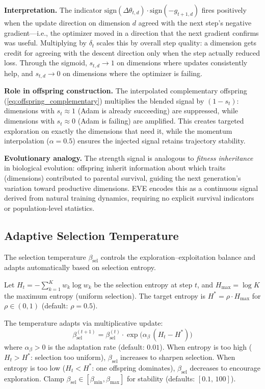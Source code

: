 \documentclass[12pt]{article}
\newcommand{\eqbox}[2]{%
  \begin{tcolorbox}[eqstyle, title={#1}]
    #2
  \end{tcolorbox}
}
\newcommand{\notebox}[1]{%
  \begin{tcolorbox}[notestyle]
    #1
  \end{tcolorbox}
}
\newcommand{\sign}{\mathrm{sign}}
\begin{document}
\textbf{Interpretation.}
The indicator
$\sign(\Delta\theta_{t,d}) \cdot \sign(-g_{t+1,d})$ fires positively
when the update direction on dimension $d$ agreed with the next step's
negative gradient---i.e., the optimizer moved in a direction that the
next gradient confirms was useful.
Multiplying by $\delta_t$ scales this by overall step quality: a
dimension gets credit for agreeing with the descent direction only
when the step actually reduced loss.
Through the sigmoid, $s_{t,d} \to 1$ on dimensions where updates
consistently help, and $s_{t,d} \to 0$ on dimensions where the
optimizer is failing.

\textbf{Role in offspring construction.}
The interpolated complementary offspring (\cref{eq:offspring_complementary})
multiplies the blended signal by $(1 - s_t)$: dimensions with
$s_t \approx 1$ (Adam is already succeeding) are suppressed, while
dimensions with $s_t \approx 0$ (Adam is failing) are amplified.
This creates targeted exploration on exactly the dimensions that need it,
while the momentum interpolation ($\alpha = 0.5$) ensures the injected
signal retains trajectory stability.

\notebox{%
\textbf{Evolutionary analogy.}
The strength signal is analogous to \emph{fitness inheritance} in
biological evolution: offspring inherit information about which traits
(dimensions) contributed to parental survival, guiding the next
generation's variation toward productive dimensions.
EVE encodes this as a continuous signal derived from natural training
dynamics, requiring no explicit survival indicators or population-level
statistics.
}


\subsection{Adaptive Selection Temperature}
\label{ssec:temperature}

The selection temperature $\beta_{\mathrm{sel}}$ controls the
exploration--exploitation balance and adapts automatically based on
selection entropy.

\eqbox{Definition 6 --- Adaptive Selection Temperature}{
Let $H_t = -\sum_{k=1}^K w_k \log w_k$ be the selection entropy
at step $t$, and $H_{\max} = \log K$ the maximum entropy (uniform
selection).
The target entropy is $H^* = \rho \cdot H_{\max}$ for
$\rho \in (0, 1)$ (default: $\rho = 0.5$).

The temperature adapts via multiplicative update:
\begin{equation}
  \beta_{\mathrm{sel}}^{(t+1)} = \beta_{\mathrm{sel}}^{(t)} \cdot
    \exp\!\bigl(\alpha_\beta\,(H_t - H^*)\bigr)
  \label{eq:temperature_adapt}
\end{equation}
\smallskip
where $\alpha_\beta > 0$ is the adaptation rate (default: $0.01$).
When entropy is too high ($H_t > H^*$: selection too uniform),
$\beta_{\mathrm{sel}}$ increases to sharpen selection.
When entropy is too low ($H_t < H^*$: one offspring dominates),
$\beta_{\mathrm{sel}}$ decreases to encourage exploration.
Clamp $\beta_{\mathrm{sel}} \in [\beta_{\min}, \beta_{\max}]$ for
stability (defaults: $[0.1,\, 100]$).
}
\end{document}
